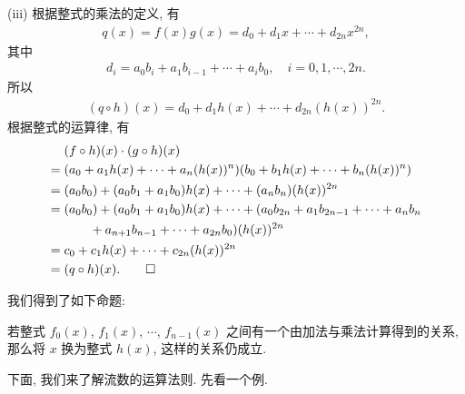 \begin{pf}
    (iii) 根据整式的乘法的定义, 有
    \begin{align*}
        q(x) = f(x) g(x) = d_0 + d_1 x + \cdots + d_{2n} x^{2n},
    \end{align*}
    其中
    \begin{align*}
        d_i = a_0 b_i + a_1 b_{i-1} + \cdots + a_i b_0, \quad i = 0,1,\cdots,2n.
    \end{align*}
    所以
    \begin{align*}
        (q \circ h)(x) = d_0 + d_1 h(x) + \cdots + d_{2n} (h(x))^{2n}.
    \end{align*}
    根据整式的运算律, 有
    \begin{align*}
             & (f \circ h)(x) \cdot (g \circ h)(x)                                                           \\
        = {} & (a_0 + a_1 h(x) + \cdots + a_n (h(x))^n) (b_0 + b_1 h(x) + \cdots + b_n (h(x))^n)             \\
        = {} & (a_0 b_0) + (a_0 b_1 + a_1 b_0) h(x) + \cdots + (a_n b_n) (h(x))^{2n}                         \\
        = {} & (a_0 b_0) + (a_0 b_1 + a_1 b_0) h(x) + \cdots + (a_0 b_{2n} + a_1 b_{2n-1} + \cdots + a_n b_n \\
             & \qquad + a_{n+1} b_{n-1} + \cdots + a_{2n} b_0) (h(x))^{2n}                                   \\
        = {} & c_0 + c_1 h(x) + \cdots + c_{2n} (h(x))^{2n}                                                  \\
        = {} & (q \circ h)(x). \qedhere
    \end{align*}
\end{pf}

我们得到了如下命题:
\begin{proposition}
    若整式 $f_0 (x)$, $f_1 (x)$, $\cdots$, $f_{n-1} (x)$ 之间有一个由加法与乘法计算得到的关系, 那么将 $x$ 换为整式 $h(x)$, 这样的关系仍成立.
\end{proposition}

下面, 我们来了解流数的运算法则. 先看一个例.

